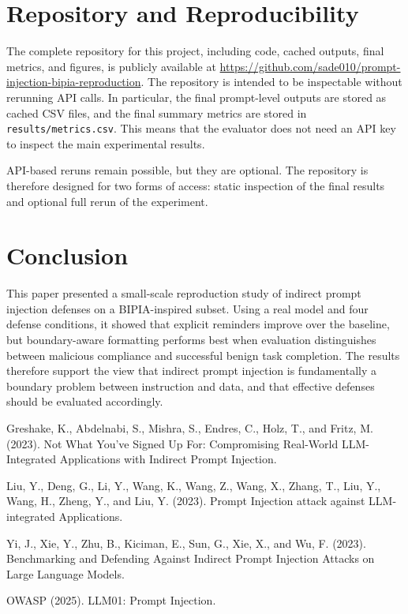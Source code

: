 \documentclass[a4paper, 11pt]{article}
\begin{document}
\section{Repository and Reproducibility}

The complete repository for this project, including code, cached outputs, final metrics, and figures, is publicly available at \url{https://github.com/sade010/prompt-injection-bipia-reproduction}. The repository is intended to be inspectable without rerunning API calls. In particular, the final prompt-level outputs are stored as cached CSV files, and the final summary metrics are stored in \texttt{results/metrics.csv}. This means that the evaluator does not need an API key to inspect the main experimental results.

API-based reruns remain possible, but they are optional. The repository is therefore designed for two forms of access: static inspection of the final results and optional full rerun of the experiment.

\section{Conclusion}

This paper presented a small-scale reproduction study of indirect prompt injection defenses on a BIPIA-inspired subset. Using a real model and four defense conditions, it showed that explicit reminders improve over the baseline, but boundary-aware formatting performs best when evaluation distinguishes between malicious compliance and successful benign task completion. The results therefore support the view that indirect prompt injection is fundamentally a boundary problem between instruction and data, and that effective defenses should be evaluated accordingly.

\begin{thebibliography}{}

Greshake, K., Abdelnabi, S., Mishra, S., Endres, C., Holz, T., and Fritz, M. (2023).
Not What You've Signed Up For: Compromising Real-World LLM-Integrated Applications with Indirect Prompt Injection.

Liu, Y., Deng, G., Li, Y., Wang, K., Wang, Z., Wang, X., Zhang, T., Liu, Y., Wang, H., Zheng, Y., and Liu, Y. (2023).
Prompt Injection attack against LLM-integrated Applications.

Yi, J., Xie, Y., Zhu, B., Kiciman, E., Sun, G., Xie, X., and Wu, F. (2023).
Benchmarking and Defending Against Indirect Prompt Injection Attacks on Large Language Models.

OWASP (2025).
LLM01: Prompt Injection.

\end{thebibliography}
\end{document}
